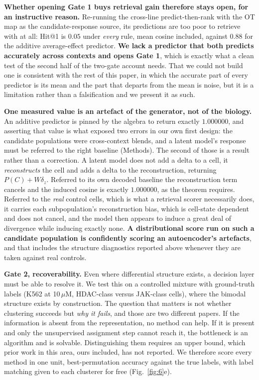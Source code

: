 \documentclass[11pt,letterpaper]{article}
\begin{document}
\textbf{Whether opening Gate 1 buys retrieval gain therefore stays open, for an instructive reason.}
Re-running the cross-line predict-then-rank with the OT map as the candidate-response source, its
predictions are too poor to retrieve with at all: Hit@1 is $0.05$ under \emph{every} rule, mean
cosine included, against $0.88$ for the additive average-effect predictor. \textbf{We lack a
predictor that both predicts accurately across contexts and opens Gate 1}, which is exactly what a
clean test of the second half of the two-gate account needs. That we could not build one is
consistent with the rest of this paper, in which the accurate part of every predictor is its mean
and the part that departs from the mean is noise, but it is a limitation rather than a falsification
and we present it as such.

\textbf{One measured value is an artefact of the generator, not of the biology.} An additive
predictor is pinned by the algebra to return exactly $1.000000$, and asserting that value is what
exposed two errors in our own first design: the candidate populations were cross-context blends,
and a latent model's response must be referred to the right baseline (Methods). The second of those
is a result rather than a correction. A latent model does not add a delta to a cell, it
\emph{reconstructs} the cell and adds a delta to the reconstruction, returning $P(C) + W\delta_z$.
Referred to its own decoded baseline the reconstruction term cancels and the induced cosine is
exactly $1.000000$, as the theorem requires. Referred to the \emph{real} control cells, which is
what a retrieval scorer necessarily does, it carries each subpopulation's reconstruction bias,
which is cell-state dependent and does not cancel, and the model then appears to induce a great
deal of divergence while inducing exactly none. \textbf{A distributional score run on such a
candidate population is confidently scoring an autoencoder's artefacts}, and that includes the
structure diagnostics reported above whenever they are taken against real controls.

\textbf{Gate 2, recoverability.} Even where differential structure exists, a decision layer must be
able to resolve it. We test this on a controlled mixture with ground-truth labels (K562 at
10\,$\mu$M, HDAC-class versus JAK-class cells), where the bimodal structure exists by construction.
The question that matters is not whether clustering succeeds but \emph{why it fails}, and those are
two different papers. If the information is absent from the representation, no method can help. If
it is present and only the unsupervised assignment step cannot reach it, the bottleneck is an
algorithm and is solvable. Distinguishing them requires an upper bound, which prior work in
this area, ours included, has not reported. We therefore score every method in one unit,
best-permutation accuracy against the true labels, with label matching given to each clusterer for
free (Fig.~\ref{fig:6}e).
\end{document}
